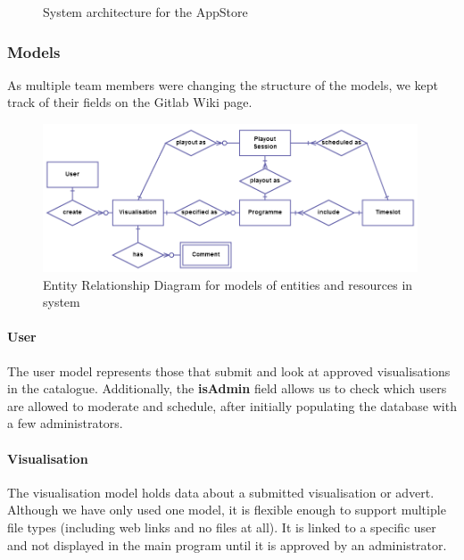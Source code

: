 \documentclass[a4paper, titlepage]{article}
\begin{document}
\begin{figure}[h!]
  \centering
  \caption{System architecture for the AppStore}
  \label{fig:impl_models}
\end{figure}


\subsubsection{Models}
As multiple team members were changing the structure of the models, we kept track of their fields
on the Gitlab Wiki page. 

\begin{figure}[h!]
  \centering
    \includegraphics[width = 0.99\textwidth]{./impl/models.png}
  \caption{Entity Relationship Diagram for models of entities and resources in system}
  \label{fig:impl_models}
\end{figure}


\paragraph{User}
The user model represents those that submit and look at approved visualisations in the catalogue. 
Additionally, the \textbf{isAdmin} field allows us to check which users are allowed to moderate 
and schedule, after initially populating the database with a few administrators. 


\paragraph{Visualisation}
The visualisation model holds data about a submitted visualisation or advert. Although we have only used
one model, it is flexible enough to support multiple file types (including web links and no files at 
all). It is linked to a specific user and not displayed in the main program until it is approved by an 
administrator.
\end{document}
